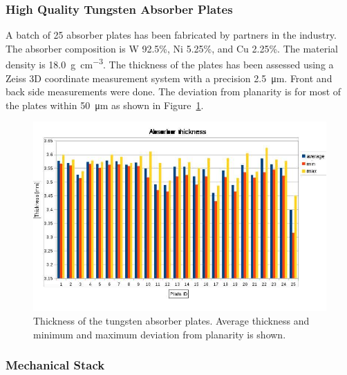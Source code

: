 \subsubsection{High Quality Tungsten Absorber Plates}

A batch of 25 absorber plates has been fabricated by partners in the industry. 
The absorber composition is W 92.5\%, Ni 5.25\%, and Cu 2.25\%.
The material density is \SI{18.0}{\gram\per\centi\meter\cubed}. The thickness of the plates has been assessed using a Zeiss 3D coordinate
measurement system with a precision \SI{2.5}{\micro\meter}. Front and back side measurements were done. The deviation
from planarity is for most of the plates within \SI{50}{\micro\meter} as shown in Figure~\ref{fig:tungsten}.
\begin{figure}
  \centering
   \includegraphics[width=0.9\columnwidth]{Calorimeter/FCAL/figs/tungsten_disk_thickness.jpeg} 
   \caption{Thickness of the tungsten absorber plates. Average thickness and minimum and maximum deviation from planarity is shown.}
  \label{fig:tungsten}
\end{figure}

\subsubsection{Mechanical Stack}

